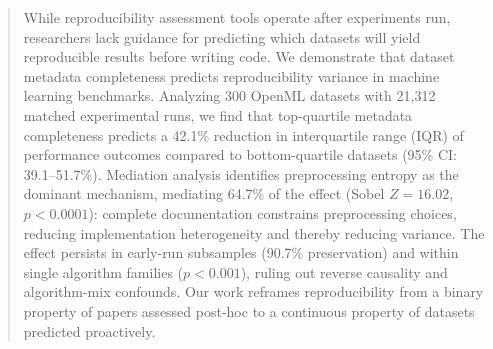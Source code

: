 \begin{abstract}
While reproducibility assessment tools operate after experiments run, researchers lack guidance for predicting which datasets will yield reproducible results before writing code. We demonstrate that dataset metadata completeness predicts reproducibility variance in machine learning benchmarks. Analyzing 300 OpenML datasets with 21,312 matched experimental runs, we find that top-quartile metadata completeness predicts a 42.1\% reduction in interquartile range (IQR) of performance outcomes compared to bottom-quartile datasets (95\% CI: 39.1--51.7\%). Mediation analysis identifies preprocessing entropy as the dominant mechanism, mediating 64.7\% of the effect (Sobel $Z = 16.02$, $p < 0.0001$): complete documentation constrains preprocessing choices, reducing implementation heterogeneity and thereby reducing variance. The effect persists in early-run subsamples (90.7\% preservation) and within single algorithm families ($p < 0.001$), ruling out reverse causality and algorithm-mix confounds. Our work reframes reproducibility from a binary property of papers assessed post-hoc to a continuous property of datasets predicted proactively.
\end{abstract}
